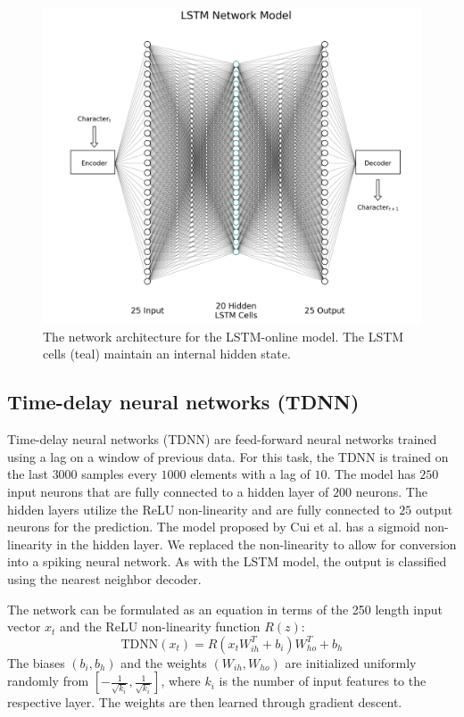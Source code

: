 \documentclass{article}
\begin{document}
\begin{figure}[H]
    \centering
    \includegraphics[width=0.9\linewidth]{../diagrams/lstm.png}
    \caption{The network architecture for the LSTM-online model. The LSTM cells (teal) maintain an internal hidden state.}
    \label{fig:lstm-online-model}
\end{figure}

\subsection*{Time-delay neural networks (TDNN)}

Time-delay neural networks (TDNN) are feed-forward neural networks trained using a lag on a window of previous data. \cite{waibel1995phoneme} For this task, the TDNN is trained on the last $3000$ samples every $1000$ elements with a lag of $10$. \cite{rojas1996backpropagation} The model has $250$ input neurons that are fully connected to a hidden layer of $200$ neurons. The hidden layers utilize the ReLU non-linearity and are fully connected to $25$ output neurons for the prediction. The model proposed by Cui et al. has a sigmoid non-linearity in the hidden layer. We replaced the non-linearity to allow for conversion into a spiking neural network. As with the LSTM model, the output is classified using the nearest neighbor decoder.

The network can be formulated as an equation in terms of the 250 length input vector $x_t$ and the ReLU non-linearity function $R(z)$:
\begin{equation}
    \text{TDNN}(x_t) = R\left(x_tW_{ih}^T + b_i\right)W_{ho}^T + b_h
    \label{eq:tdnn}
\end{equation}
The biases $\left(b_i, b_h\right)$ and the weights $\left(W_{ih}, W_{ho}\right)$ are initialized uniformly randomly from $\left[-\frac{1}{\sqrt{k_i}}, \frac{1}{\sqrt{k_i}}\right]$, where $k_i$ is the number of input features to the respective layer. The weights are then learned through gradient descent.
\end{document}
